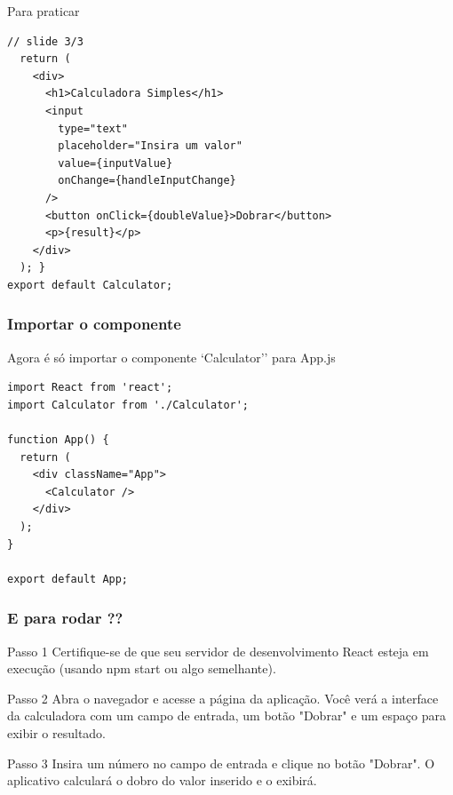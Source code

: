 \documentclass[13pt, xcolor={dvipsnames,svgnames}, portuguese]{beamer}
\begin{document}
\begin{frame}[fragile]{Para praticar}
\begin{verbatim}
// slide 3/3
  return (
    <div>
      <h1>Calculadora Simples</h1>
      <input
        type="text"
        placeholder="Insira um valor"
        value={inputValue}
        onChange={handleInputChange}
      />
      <button onClick={doubleValue}>Dobrar</button>
      <p>{result}</p>
    </div>
  ); }
export default Calculator;
\end{verbatim}
\end{frame}



\begin{frame}[fragile]
\frametitle{Importar o componente}
Agora é só importar o componente `Calculator'' para App.js

\begin{verbatim}
import React from 'react';
import Calculator from './Calculator';

function App() {
  return (
    <div className="App">
      <Calculator />
    </div>
  );
}

export default App;
\end{verbatim}

\end{frame}


\begin{frame}[fragile]
\frametitle{E para rodar ??}
\begin{block}{Passo 1}
Certifique-se de que seu servidor de desenvolvimento React esteja em execução (usando npm start ou algo semelhante).
\end{block}
\pause
\begin{block}{Passo 2}
Abra o navegador e acesse a página da aplicação. Você verá a interface da calculadora com um campo de entrada, um botão "Dobrar" e um espaço para exibir o resultado.
\end{block}
\pause
\begin{block}{Passo 3}
Insira um número no campo de entrada e clique no botão "Dobrar". O aplicativo calculará o dobro do valor inserido e o exibirá.
\end{block}
\end{frame}

\end{document}
